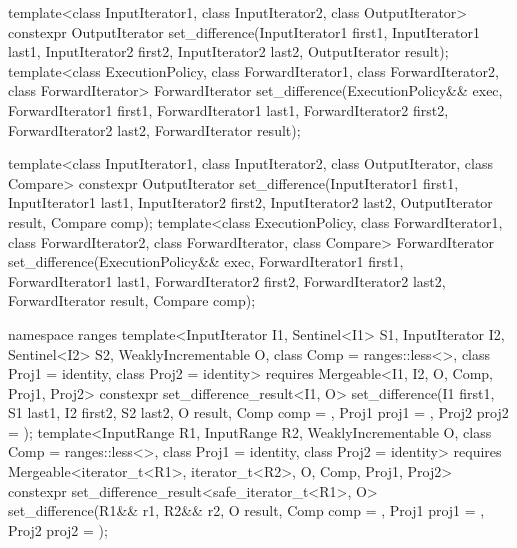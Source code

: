 %
\begin{itemdecl}
template<class InputIterator1, class InputIterator2,
         class OutputIterator>
  constexpr OutputIterator
    set_difference(InputIterator1 first1, InputIterator1 last1,
                   InputIterator2 first2, InputIterator2 last2,
                   OutputIterator result);
template<class ExecutionPolicy, class ForwardIterator1, class ForwardIterator2,
         class ForwardIterator>
  ForwardIterator
    set_difference(ExecutionPolicy&& exec,
                   ForwardIterator1 first1, ForwardIterator1 last1,
                   ForwardIterator2 first2, ForwardIterator2 last2,
                   ForwardIterator result);

template<class InputIterator1, class InputIterator2,
         class OutputIterator, class Compare>
  constexpr OutputIterator
    set_difference(InputIterator1 first1, InputIterator1 last1,
                   InputIterator2 first2, InputIterator2 last2,
                   OutputIterator result, Compare comp);
template<class ExecutionPolicy, class ForwardIterator1, class ForwardIterator2,
         class ForwardIterator, class Compare>
  ForwardIterator
    set_difference(ExecutionPolicy&& exec,
                   ForwardIterator1 first1, ForwardIterator1 last1,
                   ForwardIterator2 first2, ForwardIterator2 last2,
                   ForwardIterator result, Compare comp);

namespace ranges {
  template<InputIterator I1, Sentinel<I1> S1, InputIterator I2, Sentinel<I2> S2,
           WeaklyIncrementable O, class Comp = ranges::less<>,
           class Proj1 = identity, class Proj2 = identity>
    requires Mergeable<I1, I2, O, Comp, Proj1, Proj2>
    constexpr set_difference_result<I1, O>
      set_difference(I1 first1, S1 last1, I2 first2, S2 last2, O result,
                     Comp comp = {}, Proj1 proj1 = {}, Proj2 proj2 = {});
  template<InputRange R1, InputRange R2, WeaklyIncrementable O,
           class Comp = ranges::less<>, class Proj1 = identity, class Proj2 = identity>
    requires Mergeable<iterator_t<R1>, iterator_t<R2>, O, Comp, Proj1, Proj2>
    constexpr set_difference_result<safe_iterator_t<R1>, O>
      set_difference(R1&& r1, R2&& r2, O result,
                     Comp comp = {}, Proj1 proj1 = {}, Proj2 proj2 = {});
}
\end{itemdecl}


